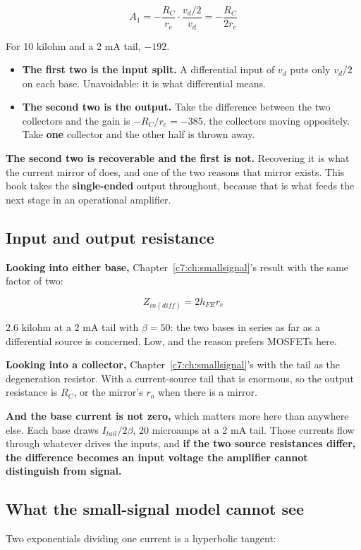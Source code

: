 \[
  A_1 = -\frac{R_C}{r_e} \cdot \frac{v_d/2}{v_d} = -\frac{R_C}{2 r_e}
\]

For 10 kilohm and a 2 mA tail, $-192$.

\begin{itemize}
  \item \textbf{The first two is the input split.} A differential input of $v_d$ puts only $v_d/2$ on each base. Unavoidable: it is what differential means.
  \item \textbf{The second two is the output.} Take the difference between the two collectors and the gain is $-R_C/r_e = -385$, the collectors moving oppositely. Take \textbf{one} collector and the other half is thrown away.
\end{itemize}

\textbf{The second two is recoverable and the first is not.} Recovering it is what the current mirror of  does, and one of the two reasons that mirror exists. This book takes the \textbf{single-ended} output throughout, because that is what feeds the next stage in an operational amplifier.

\subsection{Input and output resistance}
\label{c9:sec:a3}
\textbf{Looking into either base,} Chapter~\ref{c7:ch:smallsignal}'s result with the same factor of two:

\[
  Z_{in(diff)} = 2 h_{FE} r_e
\]

2.6 kilohm at a 2 mA tail with $\beta = 50$: the two bases in series as far as a differential source is concerned. Low, and the reason  prefers MOSFETs here.

\textbf{Looking into a collector,} Chapter~\ref{c7:ch:smallsignal}'s  with the tail as the degeneration resistor. With a current-source tail that is enormous, so the output resistance is $R_C$, or the mirror's $r_o$ when there is a mirror.

\textbf{And the base current is not zero,} which matters more here than anywhere else. Each base draws $I_{tail}/2\beta$, 20 microamps at a 2 mA tail. Those currents flow through whatever drives the inputs, and \textbf{if the two source resistances differ, the difference becomes an input voltage the amplifier cannot distinguish from signal.}

\subsection{What the small-signal model cannot see}
\label{c9:sec:a4}
Two exponentials dividing one current is a hyperbolic tangent:

